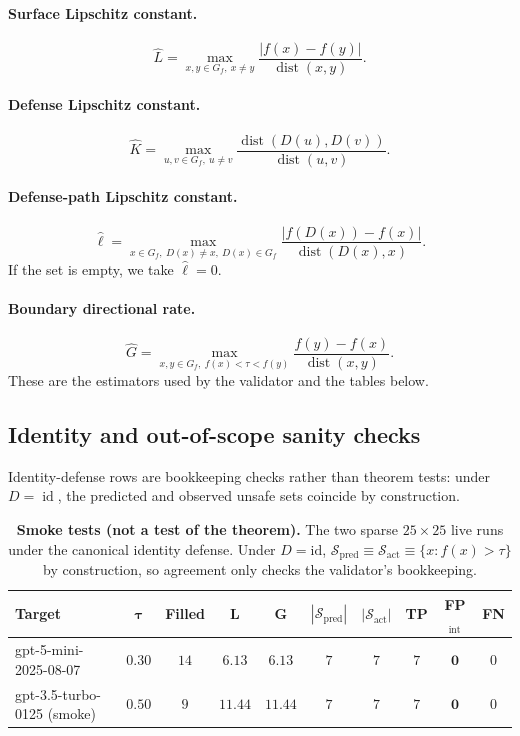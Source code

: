 \documentclass[11pt]{article}
\newcommand{\id}{\operatorname{id}}
\newcommand{\dist}{\operatorname{dist}}
\begin{document}
\paragraph{Surface Lipschitz constant.}
\[
\hat L = \max_{x,y \in G_f,\ x \neq y}
\frac{|f(x)-f(y)|}{\dist(x,y)}.
\]

\paragraph{Defense Lipschitz constant.}
\[
\hat K = \max_{u,v \in G_f,\ u \neq v}
\frac{\dist(D(u),D(v))}{\dist(u,v)}.
\]

\paragraph{Defense-path Lipschitz constant.}
\[
\hat\ell = \max_{x \in G_f,\ D(x)\neq x,\ D(x)\in G_f}
\frac{|f(D(x))-f(x)|}{\dist(D(x),x)}.
\]
If the set is empty, we take $\hat\ell = 0$.

\paragraph{Boundary directional rate.}
\[
\hat G = \max_{x,y \in G_f,\ f(x)<\tau<f(y)}
\frac{f(y)-f(x)}{\dist(x,y)}.
\]
These are the estimators used by the validator and the tables below.

\subsection{Identity and out-of-scope sanity checks}
\label{sec:identity-sanity}

Identity-defense rows are bookkeeping checks rather than theorem tests:
under $D=\id$, the predicted and observed unsafe sets coincide by
construction.

\begin{table}[h]
\centering
\small
\caption{\textbf{Smoke tests (not a test of the theorem).} The two
sparse $25\times 25$ live runs under the canonical identity defense.
Under $D = \mathrm{id}$,
$\mathcal{S}_{\text{pred}} \equiv \mathcal{S}_{\text{act}} \equiv
\{x : f(x) > \tau\}$ by construction, so agreement only checks the
validator's bookkeeping.}
\label{tab:smoketests}
\begin{tabular}{lccccccccc}
\toprule
\textbf{Target} & $\boldsymbol{\tau}$ & \textbf{Filled} & $\boldsymbol{L}$ & $\boldsymbol{G}$ & $|\mathcal{S}_{\text{pred}}|$ & $|\mathcal{S}_{\text{act}}|$ & \textbf{TP} & \textbf{FP}$_{\text{int}}$ & \textbf{FN} \\
\midrule
gpt-5-mini-2025-08-07      & $0.30$ & $14$ & $6.13$  & $6.13$  & $7$ & $7$ & $7$ & $\mathbf{0}$ & $0$ \\
gpt-3.5-turbo-0125 (smoke) & $0.50$ & $9$  & $11.44$ & $11.44$ & $7$ & $7$ & $7$ & $\mathbf{0}$ & $0$ \\
\bottomrule
\end{tabular}
\end{table}
\end{document}
